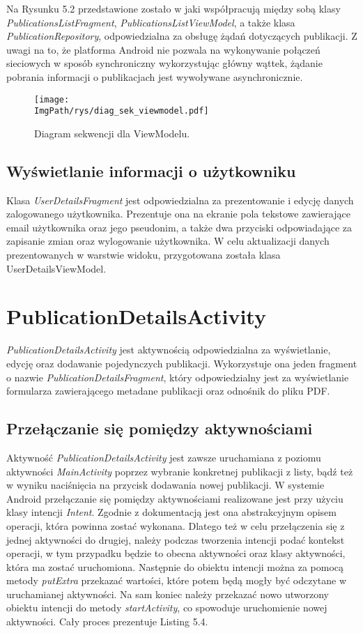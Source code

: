\documentclass[a4paper,12pt,twoside,openany]{report}
\newcommand{\ImgPath}{.}
\begin{document}
 
Na Rysunku 5.2 przedstawione zostało w jaki współpracują między sobą klasy \textit{PublicationsListFragment}, \textit{PublicationsListViewModel}, a także klasa \textit{PublicationRepository}, odpowiedzialna za obsługę żądań dotyczących publikacji. Z uwagi na to, że platforma Android nie pozwala na wykonywanie połączeń sieciowych w sposób synchroniczny wykorzystując główny wąttek, żądanie pobrania informacji o publikacjach jest wywoływane asynchronicznie.
\begin{figure}[!htbp]
	\begin{center}
		\centering
		\texttt{[image: \\ImgPath/rys/diag\_sek\_viewmodel.pdf]}
	\end{center}
	\caption{Diagram sekwencji dla ViewModelu.}
	\label{diagramAktywnosciLoginActivity}
\end{figure}

\subsection{Wyświetlanie informacji o użytkowniku}
Klasa \textit{UserDetailsFragment} jest odpowiedzialna za prezentowanie i edycję danych zalogowanego użytkownika. Prezentuje ona na ekranie pola tekstowe zawierające email użytkownika oraz jego pseudonim, a także dwa przyciski odpowiadające za zapisanie zmian oraz wylogowanie użytkownika. W celu aktualizacji danych prezentowanych w warstwie widoku, przygotowana została klasa UserDetailsViewModel.

\section{PublicationDetailsActivity}
\textit{PublicationDetailsActivity} jest aktywnością odpowiedzialna za wyświetlanie, edycję oraz dodawanie pojedynczych publikacji. Wykorzystuje ona jeden fragment o nazwie \textit{PublicationDetailsFragment}, który odpowiedzialny jest za wyświetlanie formularza zawierającego metadane publikacji oraz odnośnik do pliku PDF. 

\subsection{Przełączanie się pomiędzy aktywnościami}
Aktywność \textit{PublicationDetailsActivity} jest zawsze uruchamiana z poziomu aktywności \textit{MainActivity} poprzez wybranie konkretnej publikacji z listy, bądź też w wyniku naciśnięcia na przycisk dodawania nowej publikacji. W systemie Android przełączanie się pomiędzy aktywnościami realizowane jest przy użyciu klasy intencji \textit{Intent}. Zgodnie z dokumentacją \cite{INTENT} jest ona abstrakcyjnym opisem operacji, która powinna zostać wykonana. Dlatego też w celu przełączenia się z jednej aktywności do drugiej, należy podczas tworzenia intencji podać kontekst operacji, w tym przypadku będzie to obecna aktywności oraz klasy aktywności, która ma zostać uruchomiona. Następnie do obiektu intencji można za pomocą metody \textit{putExtra} przekazać wartości, które potem będą mogły być odczytane w uruchamianej aktywności. Na sam koniec należy przekazać nowo utworzony obiektu intencji do metody \textit{startActivity}, co spowoduje uruchomienie nowej aktywności. Cały proces prezentuje Listing 5.4.
\end{document}
